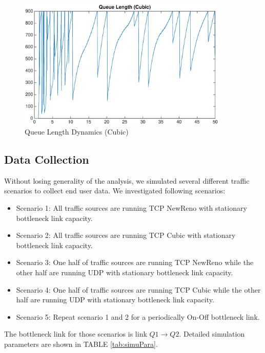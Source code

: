 \begin{figure}
\centering
\includegraphics[width=10cm]{QueueLengthCubic.eps}
\caption{Queue Length Dynamics (Cubic)}
\label{queuelengthCubic}
\end{figure}


\subsection{Data Collection}
Without losing generality of the analysis, we simulated several different traffic scenarios to collect end user data. We investigated following scenarios: 
\begin{itemize}
    \item Scenario 1: All traffic sources are running TCP NewReno with stationary bottleneck link capacity.
    \item Scenario 2: All traffic sources are running TCP Cubic with stationary bottleneck link capacity.
    \item Scenario 3: One half of traffic sources are running TCP NewReno while the other half are running UDP with stationary bottleneck link capacity.
    \item Scenario 4: One half of traffic sources are running TCP Cubic while the other half are running UDP with stationary bottleneck link capacity.
    \item Scenario 5: Repeat scenario 1 and 2 for a periodically On-Off bottleneck link.
\end{itemize}
The bottleneck link for those scenarios is link $Q1 \to Q2$. Detailed simulation parameters are shown in TABLE \ref{tab:simuPara}.

